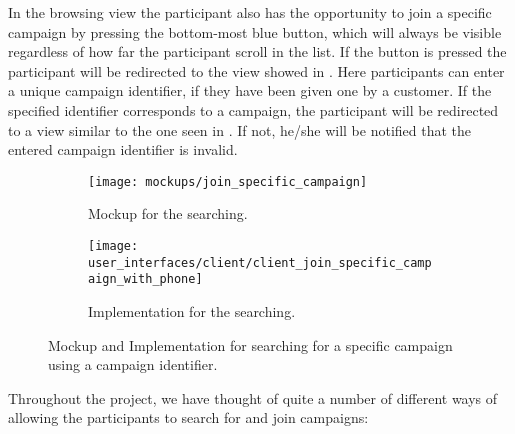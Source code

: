 In the browsing view the participant also has the opportunity to join a specific campaign by pressing the bottom-most blue button, which will always be visible regardless of how far the participant scroll in the list. If the button is pressed the participant will be redirected to the view showed in . Here participants can enter a unique campaign identifier, if they have been given one by a customer. If the specified identifier corresponds to a campaign, the participant will be redirected to a view similar to the one seen in . If not, he/she will be notified that the entered campaign identifier is invalid. 

\begin{figure}[!htbp]
    \begin{subfigure}[!t]{.48\textwidth}
        \centering
        \texttt{[image: mockups/join\_specific\_campaign]}
        \caption{Mockup for the searching.}
        \label{fig:mockup_specific_campaign}
    \end{subfigure}%
    \begin{subfigure}[!t]{.52\textwidth}
        \centering
        \texttt{[image: user\_interfaces/client/client\_join\_specific\_campaign\_with\_phone]}
        \caption{Implementation for the searching.}
        \label{fig:implementation_specific_campaign}
    \end{subfigure}
    \caption{Mockup and Implementation for searching for a specific campaign using a campaign identifier.}
    \label{fig:specific_campaign}
\end{figure}
\FloatBarrier

Throughout the project, we have thought of quite a number of different ways of allowing the participants to search for and join campaigns:

